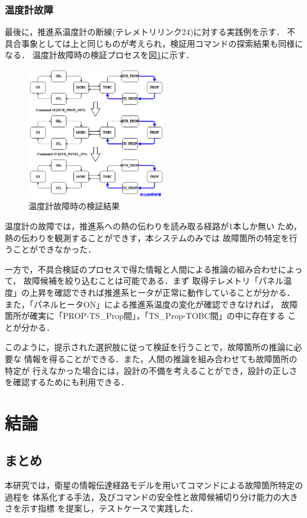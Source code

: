 \documentclass[11pt]{jsarticle}%
\begin{document}
\begin{multicols}{2}
\subsubsection{温度計故障}
最後に，推進系温度計の断線(テレメトリリンク24)に対する実践例を示す．
不具合事象としては上と同じものが考えられ，検証用コマンドの探索結果も同様になる．
温度計故障時の検証プロセスを図\ref{fig:COM_phase_TS}に示す．
\begin{figure}[H]
  \centering
    \includegraphics[width=6.0cm]{../figure/COM_process_TS_fault.png}
    \caption{温度計故障時の検証結果}
    \label{fig:COM_phase_TS}
\end{figure}
温度計の故障では，推進系への熱の伝わりを読み取る経路が1本しか無い
ため，熱の伝わりを観測することができす，本システムのみでは
故障箇所の特定を行うことができなかった．

一方で，不具合検証のプロセスで得た情報と人間による推論の組み合わせによって，
故障候補を絞り込むことは可能である．まず
取得テレメトリ「パネル温度」の上昇を確認できれば推進系ヒータが正常に動作していることが分かる．
また，「パネルヒータON」による推進系温度の変化が確認できなければ，
故障箇所が確実に「PROP-TS\_Prop間」，「TS\_Prop-TOBC間」の中に存在する
ことが分かる．

このように，提示された選択肢に従って検証を行うことで，故障箇所の推論に必要な
情報を得ることができる．また，人間の推論を組み合わせても故障箇所の特定が
行えなかった場合には，設計の不備を考えることができ，設計の正しさを確認するためにも利用できる．
\vspace{-1zh}
\section{結論}
\vspace{-1zh}
\subsection{まとめ}
\vspace{-1zh}
本研究では，衛星の情報伝達経路モデルを用いてコマンドによる故障箇所特定の過程を
体系化する手法，及びコマンドの安全性と故障候補切り分け能力の大きさを示す指標
を提案し，テストケースで実践した．


\end{multicols}
\end{document}
